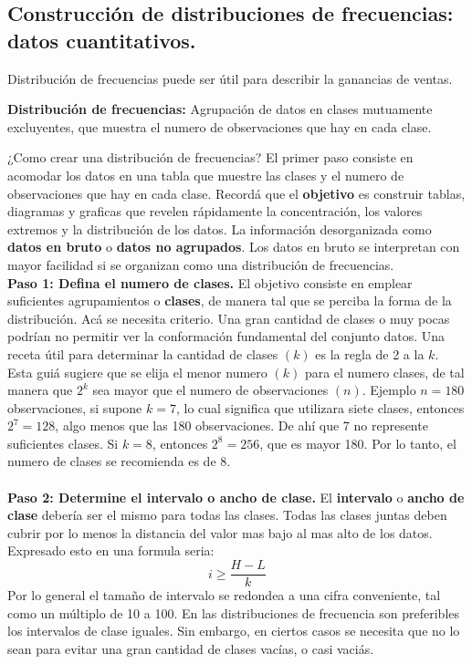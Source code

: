 \documentclass[]{article}
\begin{document}
\subsection{Construcción de distribuciones de frecuencias: datos cuantitativos.}
Distribución de frecuencias puede ser útil para describir la ganancias de ventas.
\begin{center}
	\textbf{Distribución de frecuencias: }Agrupación de datos en clases mutuamente excluyentes, que muestra el numero de observaciones que hay en cada clase.
\end{center}
¿Como crear una distribución de frecuencias? El primer paso consiste en acomodar los datos en una tabla que muestre las clases y el numero de observaciones que hay en cada clase. Recordá que el \textbf{objetivo} es construir tablas, diagramas y graficas que revelen rápidamente la concentración, los valores extremos y la distribución de los datos.
La información desorganizada como \textbf{datos en bruto} o \textbf{datos no agrupados}. Los datos en bruto se interpretan con mayor facilidad si se organizan como una distribución de frecuencias.\\
\textbf{Paso 1: Defina el numero de clases.} El objetivo consiste en emplear suficientes agrupamientos o \textbf{clases}, de manera tal que se perciba la forma de la distribución. Acá se necesita criterio. Una gran cantidad de clases o muy pocas podrían no permitir ver la conformación fundamental del conjunto datos. Una receta útil para determinar la cantidad de clases $(k)$ es la regla de 2 a la $k$. Esta guiá sugiere que se elija el menor numero $ (k) $ para el numero clases, de tal manera que $ 2^{k} $ sea mayor que el numero de observaciones $ (n) $. Ejemplo $ n=180 $ observaciones, si supone $ k=7 $, lo cual significa que utilizara siete clases, entonces $ 2^{7}=128 $, algo menos que las 180 observaciones. De ahí que 7 no represente suficientes clases. Si $ k=8 $, entonces $ 2^{8}=256$, que es mayor 180. Por lo tanto, el numero de clases se recomienda es de 8. \\\\
\textbf{Paso 2: Determine el intervalo o ancho de clase.} El \textbf{intervalo} o \textbf{ancho de clase} debería ser el mismo para todas las clases. Todas las clases juntas deben cubrir por lo menos la distancia del valor mas bajo al mas alto de los datos. Expresado esto en una formula seria:
\[ i\geq \frac{H-L}{k} \]
Por lo general el tamaño de intervalo se redondea a una cifra conveniente, tal como un múltiplo de 10 a 100. En las distribuciones de frecuencia son preferibles los intervalos de clase iguales. Sin embargo, en ciertos casos se necesita que no lo sean para evitar una gran cantidad de clases vacías, o casi vaciás.\\\\
\end{document}
